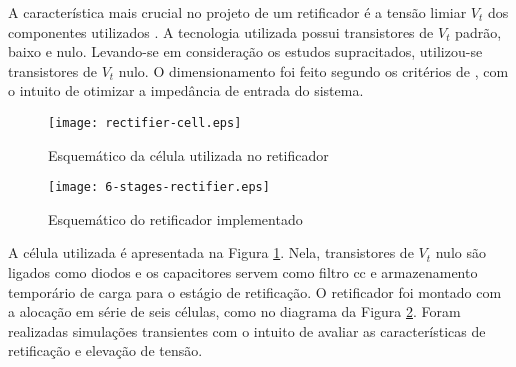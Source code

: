 A característica mais crucial no projeto de um retificador é a tensão limiar $V_t$ dos componentes utilizados \cite{YEAGER:2009}. A tecnologia utilizada possui transistores de $V_t$ padrão, baixo e nulo. Levando-se em consideração os estudos supracitados, utilizou-se transistores de $V_t$ nulo. O dimensionamento foi feito segundo os critérios de , com o intuito de otimizar a impedância de entrada do sistema.

\begin{figure}[!h]
	\caption{\label{fig:rectifier_cell}Esquemático da célula utilizada no retificador}
	\begin{center}
		\texttt{[image: rectifier-cell.eps]}
	\end{center}
\end{figure}

\begin{figure}[!h]
	\caption{\label{fig:rectifier_6_cells}Esquemático do retificador implementado}
	\begin{center}
		\texttt{[image: 6-stages-rectifier.eps]}
	\end{center}
\end{figure}

A célula utilizada é apresentada na Figura \ref{fig:rectifier_cell}. Nela, transistores de $V_t$ nulo são ligados como diodos e os capacitores servem como filtro cc e armazenamento temporário de carga para o estágio de retificação. O retificador foi montado com a alocação em série de seis células, como no diagrama da Figura \ref{fig:rectifier_6_cells}. Foram realizadas simulações transientes com o intuito de avaliar as características de retificação e elevação de tensão.




